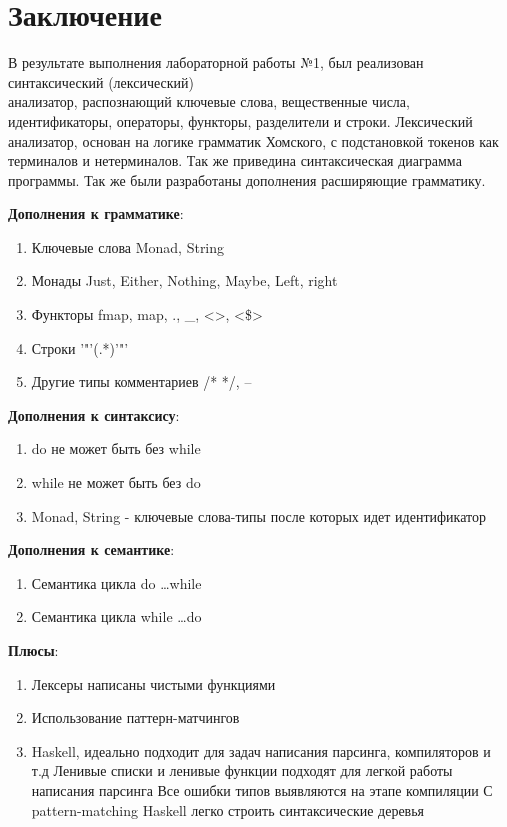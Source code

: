 \documentclass[areasetadvanced]{scrartcl}
\begin{document}
\section*{Заключение}
\begin{sloppypar}
В результате выполнения лабораторной работы №1, был реализован синтаксический (лексический) \\анализатор, распознающий ключевые слова, вещественные числа, идентификаторы, операторы, функторы, разделители и строки.
Лексический анализатор, основан на логике грамматик Хомского, с подстановкой токенов как терминалов и нетерминалов.
Так же приведина синтаксическая диаграмма программы. Так же были разработаны дополнения расширяющие грамматику.
\end{sloppypar}
\textbf{Дополнения к грамматике}:
\begin{enumerate}
    \item Ключевые слова
    \subitem Monad, String
    \item Монады
    \subitem Just, Either, Nothing, Maybe, Left, right
    \item Функторы
    \subitem fmap, map, ., \_, <>, <\$>
    \item Строки
    \subitem '"'(.*)'"'
    \item Другие типы комментариев
    \subitem /* */, --
\end{enumerate}
\textbf{Дополнения к синтаксису}:
\begin{enumerate}
    \item do не может быть без while
    \item while не может быть без do
    \item Monad, String - ключевые слова-типы после которых идет идентификатор
\end{enumerate}
\textbf{Дополнения к семантике}:
\begin{enumerate}
    \item Семантика цикла do \dots while
    \item Семантика цикла while \dots do
\end{enumerate}
\textbf{Плюсы}: 
\begin{enumerate}
    \item Лексеры написаны чистыми функциями
    \item Использование паттерн-матчингов
    \item Haskell, идеально подходит для задач написания парсинга, компиляторов и т.д 
    \subitem Ленивые списки и ленивые функции подходят для легкой работы написания парсинга
    \subitem Все ошибки типов выявляются на этапе компиляции
    \subitem С pattern-matching Haskell легко строить синтаксические деревья
\end{enumerate}
\end{document}
